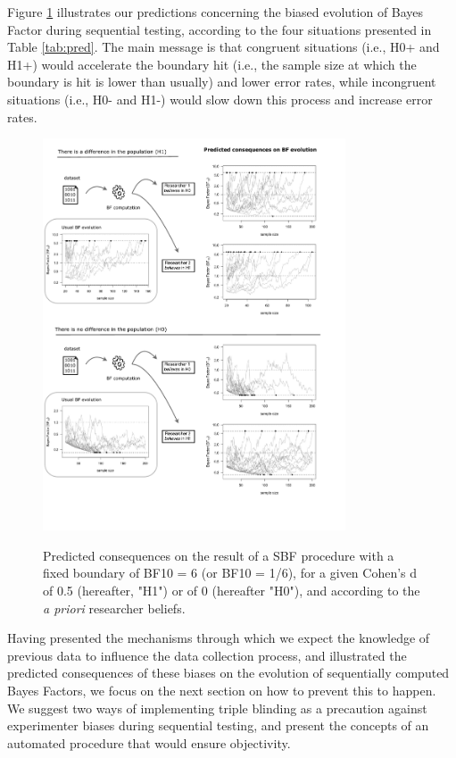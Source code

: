 \documentclass[a4paper,man,natbib,floatsintext,donotrepeattitle]{apa6}
\begin{document}
Figure \ref{fig:pred} illustrates our predictions concerning the biased evolution of Bayes Factor during sequential testing, according to the four situations presented in Table \ref{tab:pred}. The main message is that congruent situations (i.e., H0+ and H1+) would accelerate the boundary hit (i.e., the sample size at which the boundary is hit is lower than usually) and lower error rates, while incongruent situations (i.e., H0- and H1-) would slow down this process and increase error rates.

\begin{figure}[H]
  \caption{Predicted consequences on the result of a SBF procedure with a fixed boundary of BF10 = 6 (or BF10 = 1/6), for a given Cohen's d of 0.5 (hereafter, "H1") or of 0 (hereafter "H0"), and according to the \emph{a priori} researcher beliefs.}
  \centering
  \includegraphics[width=0.8\textwidth]{figures/BFF_predictions.pdf}
  \label{fig:pred}
\end{figure}

Having presented the mechanisms through which we expect the knowledge of previous data to influence the data collection process, and illustrated the predicted consequences of these biases on the evolution of sequentially computed Bayes Factors, we focus on the next section on how to prevent this to happen. We suggest two ways of implementing triple blinding as a precaution against experimenter biases during sequential testing, and present the concepts of an automated procedure that would ensure objectivity.
\end{document}
